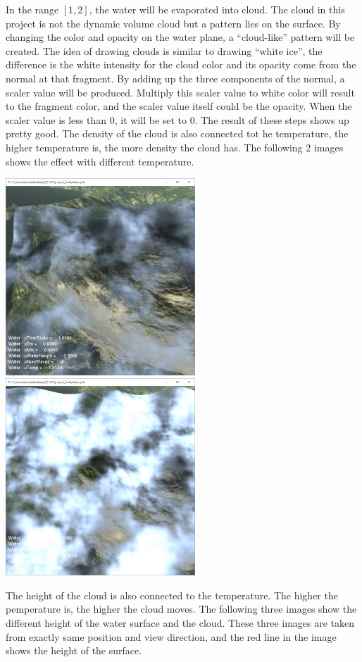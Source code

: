 \documentclass[letterpaper,14pt,titlepage,fleqn]{article}
\begin{document}
In the range $[1, 2]$, the water will be evaporated into cloud. The cloud in this project is not the dynamic volume cloud but a pattern lies on the surface. By changing the color and opacity on the water plane, a ``cloud-like'' pattern will be created. The idea of drawing clouds is similar to drawing ``white ice'', the difference is the white intensity for the cloud color and its opacity come from the normal at that fragment. By adding up the three components of the normal, a scaler value will be produced. Multiply this scaler value to white color will result to the fragment color, and the scaler value itself could be the opacity. When the scaler value is less than 0, it will be set to 0. The result of these steps shows up pretty good. The density of the cloud is also connected tot he temperature, the higher temperature is, the more density the cloud has. The following 2 images shows the effect with different temperature. 
\begin{center}
	\includegraphics[width=2.8in]{cloud1.jpg}
	\includegraphics[width=2.8in]{cloud2.jpg}
\end{center}
The height of the cloud is also connected to the temperature. The higher the pemperature is, the higher the cloud moves. The following three images show the different height of the water surface and the cloud. These three images are taken from exactly same position and view direction, and the red line in the image shows the height of the surface.
\end{document}
